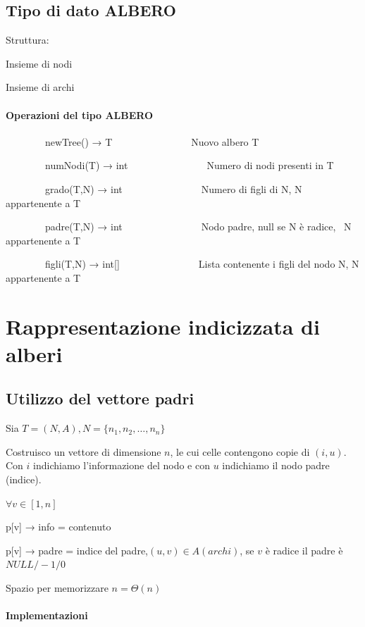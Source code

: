 \subsection{Tipo di dato ALBERO}

{Struttura:}

{Insieme di nodi}

{Insieme di archi}


\paragraph{Operazioni del tipo ALBERO}


{~~~~~~~~newTree() → T~~~~~~~~~~~~~~~~Nuovo albero T}

{~~~~~~~~numNodi(T) → int~~~~~~~~~~~~~~~~Numero di nodi presenti in T}

{~~~~~~~~grado(T,N) → int~~~~~~~~~~~~~~~~Numero di figli di N, N
appartenente a T}

{~~~~~~~~padre(T,N) → int~~~~~~~~~~~~~~~~Nodo padre, null se N è radice,
~N appartenente a T}

{~~~~~~~~figli(T,N) → int{[}{]}~~~~~~~~~~~~~~~~Lista contenente i figli
del nodo N, N appartenente a T}

{}

\section{Rappresentazione indicizzata di alberi}

\subsection{Utilizzo del vettore padri}

{Sia $T=(N,A), N = \{n_1,n_2,\ldots,n_n\}$}

{Costruisco un vettore di dimensione $n$, le cui celle contengono copie di $(i,u)$. Con $i$ indichiamo l'informazione del nodo e con $u$ indichiamo il nodo padre (indice).}

$\forall v \in [1,n]$

{p{[}v{]} → info = contenuto}

{p{[}v{]} → padre = indice del padre,$(u,v) \in A(archi)$, se $v$ è radice il padre è $NULL/-1/0$}

{Spazio per memorizzare $n=\Theta(n)$}

\paragraph{Implementazioni}

